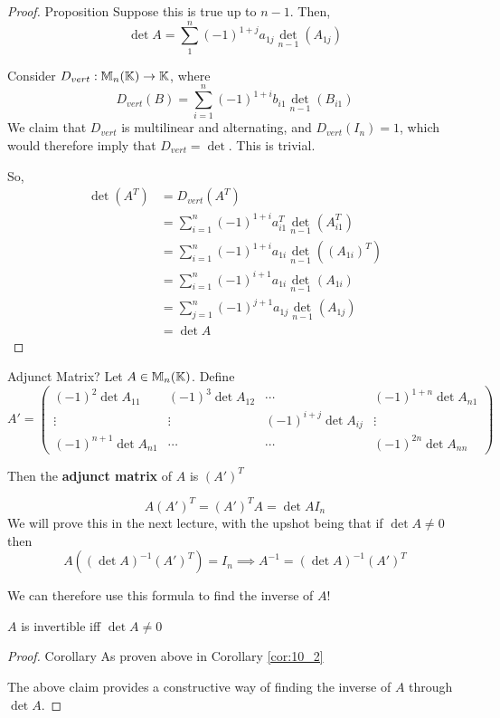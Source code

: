 \begin{proof} {Proposition}
    Suppose this is true up to \(n-1\). Then, \[
        \det A = \sum_{1}^{n} (-1)^{1+j} a_{1j} \det_{n-1}(A_{1j})
    \]

    Consider \(D_{vert}: \mathbb{M}_n(\mathbb{K}) \to \mathbb{K}\), where \[
        D_{vert}(B) = \sum_{i=1}^{n} (-1)^{1+i}b_{i1} \det_{n-1}(B_{i1})
    \]
    We claim that \(D_{vert}\) is multilinear and alternating, and \(D_{vert}(I_n) = 1\), which would therefore imply that \(D_{vert} = \det\). This is trivial.

    So, \begin{align*}
        \det(A^T) & = D_{vert}(A^T)                                             \\
                  & = \sum_{i=1}^{n} (-1)^{1+i} a^T_{i1}\det_{n-1}(A^T_{i1})    \\
                  & = \sum_{i=1}^{n}   (-1)^{1+i} a_{1i} \det_{n-1}((A_{1i})^T) \\
                  & = \sum_{i=1}^{n} (-1)^{i+1} a_{1i} \det_{n-1}(A_{1i})       \\
                  & = \sum_{j=1}^{n} (-1)^{j+1} a_{1j} \det_{n-1}(A_{1j})       \\
                  & = \det A
    \end{align*}
\end{proof}

\begin{definition} {Adjunct Matrix?}
    Let \(A \in \mathbb{M}_n(\mathbb{K})\). Define \[
        A' = \begin{pmatrix}
            (-1)^2 \det A_{11}     & (-1)^3 \det A_{12} & \cdots                & (-1)^{1+n} \det A_{n1} \\
            \vdots                 & \vdots             & (-1)^{i+j}\det A_{ij} & \vdots                 \\
            (-1)^{n+1} \det A_{n1} & \cdots             & \cdots                & (-1)^{2n} \det A_{nn}
        \end{pmatrix}
    \]

    Then the \textbf{adjunct matrix} of \(A\) is \((A')^T\)
\end{definition}

\begin{claim}
\[
A (A')^T = (A')^T A = \det A I_n
\]
We will prove this in the next lecture, with the upshot being that if \(\det A \neq 0\) then \[
A ((\det A) ^{-1} (A')^T) = I_n \implies A^{-1} = (\det A) ^{-1} (A')^T
\]

We can therefore use this formula to find the inverse of \(A\)!
\end{claim}

\begin{corollary}
\(A\) is invertible iff \(\det A \neq 0\)
\end{corollary}

\begin{proof} {Corollary}
\pffwd As proven above in Corollary \ref{cor:10_2}

\pfbwd The above claim provides a constructive way of finding the inverse of \(A\) through \(\det A\).
\end{proof}